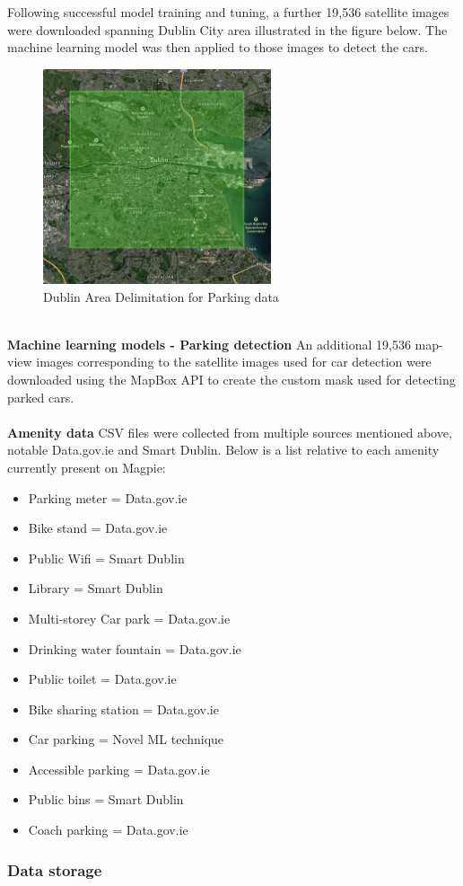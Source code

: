 Following successful model training and tuning, a further 19,536 satellite images were downloaded spanning Dublin City area illustrated in the figure below. The machine learning model was then applied to those images to detect the cars.
\begin{figure}[h!]
    \centering
    \includegraphics[width=0.6\textwidth]{images/dublin-img-area.jpg}
    \caption{Dublin Area Delimitation for Parking data}
\end{figure}\\

\textbf{Machine learning models - Parking detection}
An additional 19,536 map-view images corresponding to the satellite images used for car detection were downloaded using the MapBox API to create the custom mask used for detecting parked cars.\\ \\

\textbf{Amenity data}
CSV files were collected from multiple sources mentioned above, notable Data.gov.ie and Smart Dublin. Below is a list relative to each amenity currently present on Magpie:
\begin{itemize}
    \item Parking meter = Data.gov.ie
    \item Bike stand = Data.gov.ie
    \item Public Wifi = Smart Dublin
    \item Library = Smart Dublin
    \item Multi-storey Car park = Data.gov.ie
    \item Drinking water fountain = Data.gov.ie
    \item Public toilet = Data.gov.ie
    \item Bike sharing station = Data.gov.ie
    \item Car parking = Novel ML technique
    \item Accessible parking = Data.gov.ie
    \item Public bins = Smart Dublin
    \item Coach parking = Data.gov.ie
\end{itemize}

\subsubsection{Data storage}
